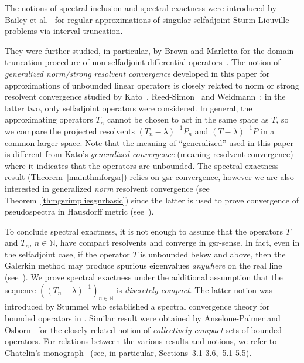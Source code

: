 \documentclass[a4paper,reqno]{amsart}
\begin{document}
The notions of spectral inclusion and spectral exactness w{ere} introduced by Bailey et al.\ \cite{Bailey-1993} for regular approximations of singular selfadjoint Sturm-Liouville problems via interval truncation.
{They were further studied, in particular, by Brown and Marletta for the  domain truncation procedure of non-selfadjoint differential operators~\cite{Brown-Marletta-2001,Brown-Marletta-2003,Brown-Marletta-2004}. 
The notion of  \emph{generalized norm/strong resolvent convergence}
developed in this paper
for approximations of unbounded linear operators
 is closely related to norm or strong resolvent convergence studied by Kato~\cite[Sections~IV.2,VIII.1]{kato},
Reed-Simon~\cite[Theorems~VIII.23-25]{reedsimon1} and Weidmann~\cite[Section~9.3]{weid1};
in the latter two, only selfadjoint operators were considered.
In general, the approximating operators $T_n$ 
cannot be chosen to act in the same space as $T$,
so we 
compare the projected resolvents $(T_n-\lambda)^{-1}P_n$ and $(T-\lambda)^{-1}P$ in a common larger space. 
Note that the meaning of ``generalized'' used in this paper 
is different from Kato's \emph{generalized convergence}
(meaning resolvent convergence)
where it indicates that the operators are unbounded.
The spectral exactness result  (Theorem~\ref{mainthmforgsr}) relies on gsr-convergence, however we are also interested 
in generalized \emph{norm} resolvent convergence (see Theorem~\ref{thmgsrimpliesgnrbasic}) since the latter is used to prove convergence of pseudospectra in Hausdorff metric (see~\cite[Theorem~2.1]{boegli-siegl-2014}).

To conclude spectral exactness, it is not enough to assume that the operators $T$ and $T_n$, $n\in{\mathbb{N}}$, have compact resolvents and converge in gsr-sense.
In fact, even in the selfadjoint case, if the operator $T$ is unbounded below and above, then the Galerkin method may produce spurious eigenvalues \emph{anywhere} on the real line (see~\cite[Theorem~2.1]{levitinshargorodsky}). 
We prove spectral exactness under the additional assumption that the sequence $((T_n-\lambda)^{-1})_{n\in{\mathbb{N}}}$ is \emph{discretely compact}.
The latter notion was introduced by Stummel who  established a spectral convergence theory for bounded operators in \cite{stummel1,stummel2}.
Similar result were obtained by  Anselone-Palmer and Osborn~\cite{anselonepalmer,osborn} for the closely related notion of \emph{collectively compact} sets of bounded operators.
For relations between the various results and notions,
we refer to Chatelin's monograph~\cite{chatelin} (see, in particular, Sections~3.1-3.6,~5.1-5.5). 

}
\end{document}
